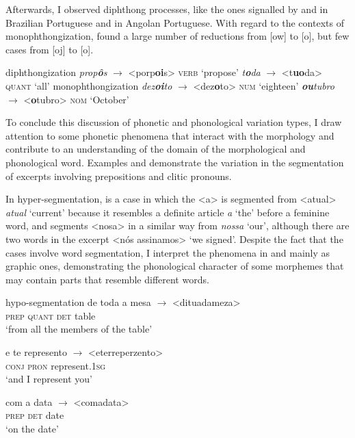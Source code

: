 \documentclass[output=paper,colorlinks,citecolor=brown]{langscibook}
\begin{document}
Afterwards, I observed diphthong processes, like the ones signalled by \citet{Noll_2008} and \citet[409]{Oliveira_2006} in Brazilian Portuguese and \citet[162]{Petter_2009} in Angolan Portuguese. With regard to the contexts of monophthongization, \citet[408]{Oliveira_2006} found a large number of reductions from [ow] to [o], but few cases from [oj] to [o].

\newpage
\ea\label{ex:6:17} diphthongization
\ea \emph{prop\textbf{ô}s} $\rightarrow$ <porp\textbf{oi}s> \textsc{verb} ‘propose’
\ex \emph{t\textbf{o}da} $\rightarrow$ <t\textbf{uo}da> \textsc{quant} ‘all’
\z
\ex\label{ex:6:18} monophthongization
\ea \emph{dez\textbf{oi}to} $\rightarrow$ <dez\textbf{o}to> \textsc{num} ‘eighteen’
\ex \emph{\textbf{ou}tubro} $\rightarrow$ <\textbf{o}tubro> \textsc{nom} ‘October’
    \z
\z

To conclude this discussion of phonetic and phonological variation types, I draw attention to some phonetic phenomena that interact with the morphology and contribute to an understanding of the domain of the morphological and phonological word. Examples  and  demonstrate the variation in the segmentation of excerpts involving prepositions and clitic pronouns.

In hyper-segmentation,  is a case in which the <a> is segmented from <atual> \emph{atual} ‘current’ because it resembles a definite article \emph{a} ‘the’ before a feminine word, and  segments <nosa> in a similar way from \emph{nossa} ‘our’, although there are two words in the excerpt <nós assinamos> ‘we signed’. Despite the fact that the cases involve word segmentation, I interpret the phenomena in  and  mainly as graphic ones, demonstrating the phonological character of some morphemes that may contain parts that resemble different words.

\ea\label{ex:6:19}
hypo-segmentation
\ea\label{ex:6:19a} \gll de toda a mesa $\rightarrow$ <dituadameza> \\
         \textsc{prep} \textsc{quant} \textsc{det} table \\
\glt ‘from all the members of the table’

\ex\label{ex:6:19b} \gll e te represento  $\rightarrow$ <eterreperzento> \\
        \textsc{conj} \textsc{pron} represent.\textsc{1sg} \\
\glt ‘and I represent you’

\ex\label{ex:6:19c} \gll com a data $\rightarrow$ <comadata> \\
         \textsc{prep}  \textsc{det}  date \\
\glt ‘on the date’
\end{document}
